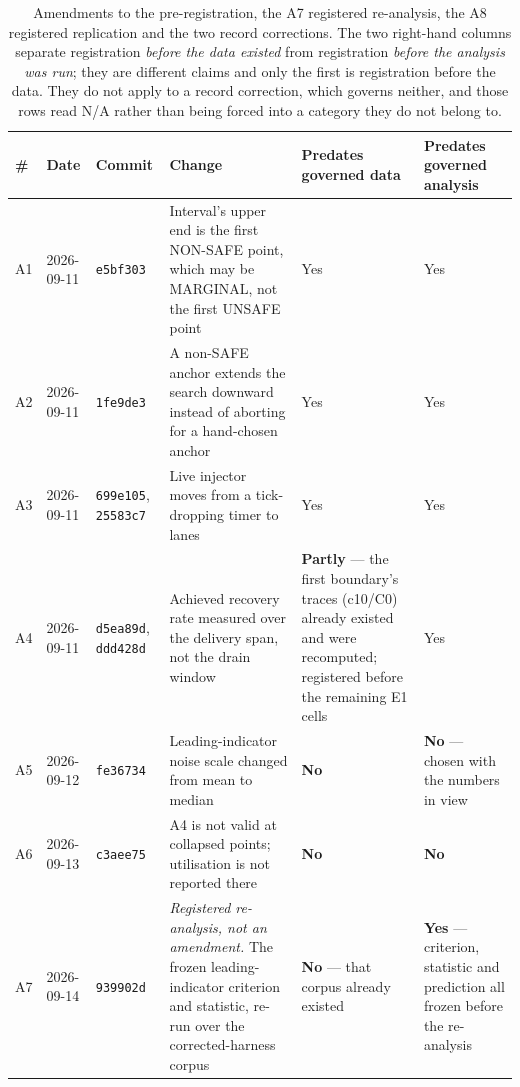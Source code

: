 \documentclass{ieeeaccess}
\begin{document}
\begin{table}[!t]
\caption[Amendments to the pre-registration, the A7 registered re-analysis, the A8 registered replication and the two record corrections.]{Amendments to the pre-registration, the A7 registered re-analysis, the A8 registered replication and the two record corrections. The two right-hand columns separate registration \textit{before the data existed} from registration \textit{before the analysis was run}; they are different claims and only the first is registration before the data. They do not apply to a record correction, which governs neither, and those rows read N/A rather than being forced into a category they do not belong to.}
\label{tab:s1-amendments}
\centering
\footnotesize
\begin{tabularx}{\textwidth}{lll>{\raggedright\arraybackslash}X>{\raggedright\arraybackslash}X>{\raggedright\arraybackslash}X}
\hline
{\bfseries \#} & {\bfseries Date} & {\bfseries Commit} & {\bfseries Change} & {\bfseries Predates governed data} & {\bfseries Predates governed analysis} \\ \hline
A1 & 2026-09-11 & \texttt{e5bf303} & Interval's upper end is the first NON-SAFE point, which may be MARGINAL, not the first UNSAFE point & Yes & Yes \\
A2 & 2026-09-11 & \texttt{1fe9de3} & A non-SAFE anchor extends the search downward instead of aborting for a hand-chosen anchor & Yes & Yes \\
A3 & 2026-09-11 & \texttt{699e105}, \texttt{25583c7} & Live injector moves from a tick-dropping timer to lanes & Yes & Yes \\
A4 & 2026-09-11 & \texttt{d5ea89d}, \texttt{ddd428d} & Achieved recovery rate measured over the delivery span, not the drain window & {\bfseries Partly} --- the first boundary's traces (c10/C0) already existed and were recomputed; registered before the remaining E1 cells & Yes \\
A5 & 2026-09-12 & \texttt{fe36734} & Leading-indicator noise scale changed from mean to median & {\bfseries No} & {\bfseries No} --- chosen with the numbers in view \\
A6 & 2026-09-13 & \texttt{c3aee75} & A4 is not valid at collapsed points; utilisation is not reported there & {\bfseries No} & {\bfseries No} \\
A7 & 2026-09-14 & \texttt{939902d} & \textit{Registered re-analysis, not an amendment.} The frozen leading-indicator criterion and statistic, re-run over the corrected-harness corpus & {\bfseries No} --- that corpus already existed & {\bfseries Yes} --- criterion, statistic and prediction all frozen before the re-analysis \\

\end{tabularx}
\end{table}
\end{document}
